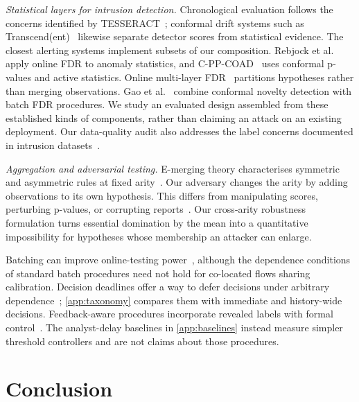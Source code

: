 \documentclass[conference]{IEEEtran}
\begin{document}
\emph{Statistical layers for intrusion detection.} Chronological evaluation follows the concerns
identified by TESSERACT~\cite{pendlebury2019tesseract}; conformal drift systems such as
Transcend(ent)~\cite{jordaney2017transcend,barbero2022transcendent} likewise separate detector scores
from statistical evidence. The closest alerting systems implement subsets of our composition.
Rebjock et al.~\cite{rebjock2021online} apply online FDR to anomaly statistics, and
C-PP-COAD~\cite{farzaneh2025coad} uses conformal p-values and active statistics.
Online multi-layer FDR~\cite{wang2025multilayer} partitions hypotheses rather than merging
observations. Gao et al.~\cite{gao2026boundary} combine conformal novelty detection
with batch FDR procedures. We study an evaluated design assembled from these established kinds
of components, rather than claiming an attack on an existing deployment. Our data-quality audit
also addresses the label concerns documented in intrusion
datasets~\cite{engelen2021troubleshooting,liu2022error}.

\emph{Aggregation and adversarial testing.} E-merging theory characterises symmetric and asymmetric
rules at fixed arity~\cite{vovk2021evalues,wang2025admissible}. Our adversary changes the arity by
adding observations to its own hypothesis. This differs from manipulating scores, perturbing
p-values, or corrupting reports~\cite{yasodharan2019nonzero,chen2024adversarialbh,zhang2025conformalevasion,zhang2025byzantine}.
Our cross-arity robustness formulation turns essential domination by the mean into a quantitative
impossibility for hypotheses whose membership an attacker can enlarge.

Batching can improve online-testing power~\cite{zrnic2020batching}, although the dependence
conditions of standard batch procedures need not hold for co-located flows sharing calibration.
Decision deadlines offer a way to defer decisions under arbitrary
dependence~\cite{fisher2022deadlines,xu2026eclosure}; \cref{app:taxonomy} compares them with immediate
and history-wide decisions. Feedback-aware procedures incorporate revealed labels with formal
control~\cite{lu2026gaif,liu2025ocsarc}. The analyst-delay baselines in \cref{app:baselines} instead
measure simpler threshold controllers and are not claims about those procedures.

\section{Conclusion}\label{sec:conclusion}
\end{document}
